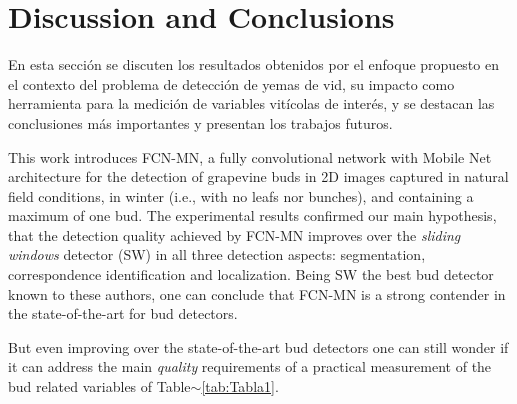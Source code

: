 \documentclass[a4paper,authoryear,review]{elsarticle}
\begin{document}

\section{Discussion and Conclusions} \label{sec:discussion}

En esta sección se discuten los resultados obtenidos por el enfoque propuesto en el contexto del problema de detección de yemas de vid, su impacto como herramienta para la medición de variables vitícolas de interés, y se destacan las conclusiones más importantes y presentan los trabajos futuros. 


This work introduces FCN-MN, a fully convolutional network with Mobile Net architecture for the detection of grapevine buds in 2D images captured in natural field conditions, in winter (i.e., with no leafs nor bunches), and containing a maximum of one bud.
%
The experimental results confirmed our main hypothesis, that the detection quality achieved by FCN-MN improves over the \emph{sliding windows} detector (SW) in all three detection aspects: segmentation, correspondence identification and localization. Being SW the best bud detector known to these authors, one can conclude that FCN-MN is a strong contender in the state-of-the-art for bud detectors.




But even improving over the state-of-the-art bud detectors one can still wonder if it can address the main \emph{quality} requirements of a practical measurement of the bud related variables of Table$\sim$\ref{tab:Tabla1}.
\end{document}
